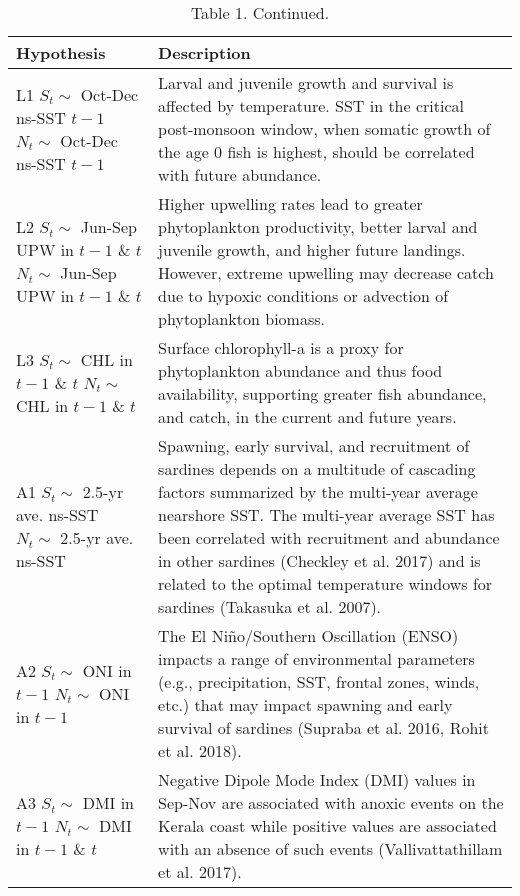 \begin{table}

\caption{\label{tab:unnamed-chunk-2}Table 1. Continued.}
\centering
\begin{tabular}[t]{>{\raggedright\arraybackslash}p{5.5cm}|>{\raggedright\arraybackslash}p{10cm}}
\hline
Hypothesis & Description\\
\hline
L1 \newline $S_t \sim$ Oct-Dec ns-SST $t-1$ \newline $N_t \sim$ Oct-Dec ns-SST $t-1$ & Larval and juvenile growth and survival is affected by temperature. SST in the critical post-monsoon window, when somatic growth of the age 0 fish is highest, should be correlated with future abundance.\\
\hline
L2 \newline $S_t \sim$ Jun-Sep UPW in $t-1$ \& $t$ \newline $N_t \sim$ Jun-Sep UPW in $t-1$ \& $t$ & Higher upwelling rates lead to greater phytoplankton productivity, better larval and juvenile growth, and higher future landings. However, extreme upwelling may decrease catch due to hypoxic conditions or advection of phytoplankton biomass.\\
\hline
L3 \newline $S_t\sim$ CHL in $t-1$ \& $t$ \newline $N_t \sim$ CHL in $t-1$ \& $t$ & Surface chlorophyll-a is a proxy for phytoplankton abundance and thus food availability, supporting greater fish abundance, and catch, in the current and future years.\\
\hline
A1 \newline $S_t \sim$ 2.5-yr ave. ns-SST \newline $N_t \sim$ 2.5-yr ave. ns-SST & Spawning, early survival, and recruitment of sardines depends on a multitude of cascading factors summarized by the multi-year average  nearshore SST. The multi-year average SST has been correlated with recruitment and abundance in other sardines (Checkley et al. 2017) and is related to the optimal temperature windows for sardines (Takasuka et al. 2007).\\
\hline
A2 \newline $S_t \sim$ ONI in $t-1$ \newline $N_t \sim$ ONI in $t-1$ & The El Niño/Southern Oscillation (ENSO) impacts a range of environmental parameters (e.g., precipitation, SST, frontal zones, winds, etc.) that may impact spawning and early survival of sardines (Supraba et al. 2016, Rohit et al. 2018).\\
\hline
A3 \newline $S_t \sim$ DMI in $t-1$ \newline $N_t \sim$ DMI in $t-1$ \& $t$ & Negative Dipole Mode Index (DMI) values in Sep-Nov are associated with anoxic events on the Kerala coast while positive values are associated with an absence of such events (Vallivattathillam et al. 2017).\\
\hline
\end{tabular}
\end{table}

